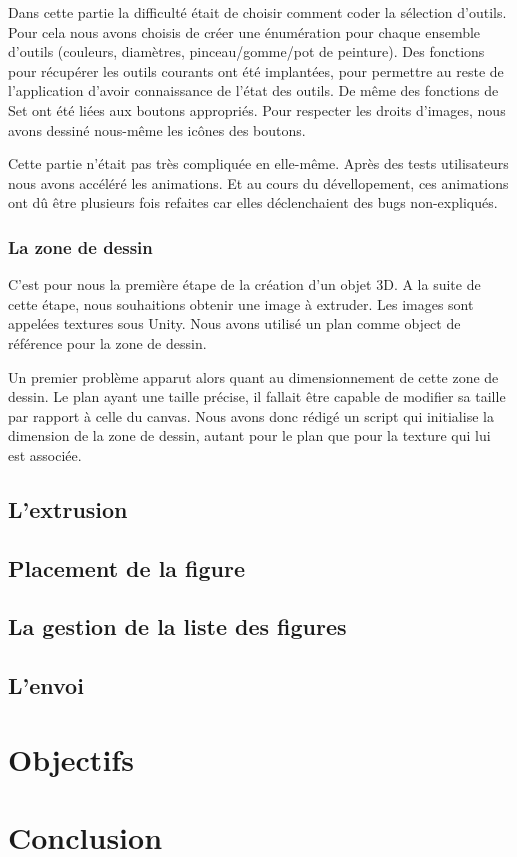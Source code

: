 \documentclass[a4paper,11pt]{article}
\begin{document}
				Dans cette partie la difficulté était de choisir comment coder la sélection d'outils. Pour cela nous avons choisis de créer une énumération pour chaque ensemble d'outils (couleurs, diamètres, pinceau/gomme/pot de peinture). Des fonctions pour récupérer les outils courants ont été implantées, pour permettre au reste de l'application d'avoir connaissance de l'état des outils. De même des fonctions de Set ont été liées aux boutons appropriés. Pour respecter les droits d'images, nous avons dessiné nous-même les icônes des boutons.
				
				Cette partie n'était pas très compliquée en elle-même. Après des tests utilisateurs nous avons accéléré les animations. Et au cours du dévellopement, ces animations ont dû être plusieurs fois refaites car elles déclenchaient des bugs non-expliqués.
			\subsubsection{La zone de dessin}
			C'est pour nous la première étape de la création d'un objet 3D. A la suite de cette étape, nous souhaitions obtenir une image à extruder. Les images sont appelées textures sous Unity. Nous avons utilisé un plan comme object de référence pour la zone de dessin.
			
			Un premier problème apparut alors quant au dimensionnement de cette zone de dessin. Le plan ayant une taille précise, il fallait être capable de modifier sa taille par rapport à celle du canvas. Nous avons donc rédigé un script qui initialise la dimension de la zone de dessin, autant pour le plan que pour la texture qui lui est associée.
			
			
		\subsection{L'extrusion}
		\subsection{Placement de la figure}
		\subsection{La gestion de la liste des figures}
		\subsection{L'envoi}
	\section{Objectifs}
	\section{Conclusion}
	
\end{document}
